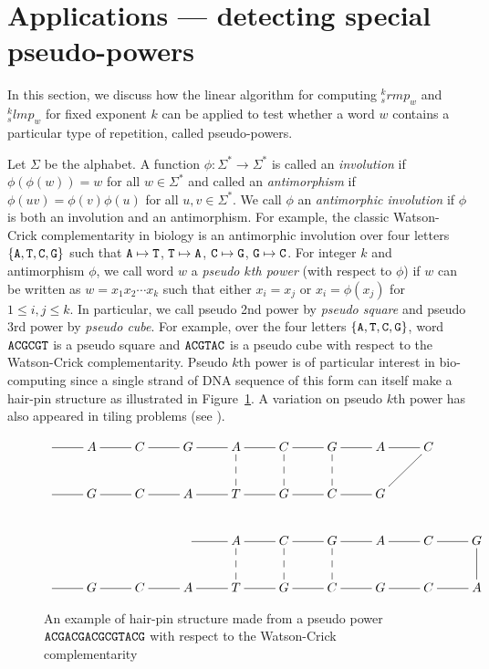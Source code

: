 \documentclass{article}
\begin{document}
\section{Applications --- detecting special pseudo-powers}
In this section, we discuss how the linear algorithm for computing
${}_s^krmp_w$ and ${}_s^klmp_w$ for fixed exponent $k$ can be
applied to test whether a word $w$ contains a particular type of
repetition, called pseudo-powers.


Let $\Sigma$ be the alphabet. A function $\phi:\Sigma^*\to\Sigma^*$
is called an \emph{involution} if $\phi(\phi(w))=w$ for all
$w\in\Sigma^*$ and called an \emph{antimorphism} if
$\phi(uv)=\phi(v)\phi(u)$ for all $u,v\in\Sigma^*$. We call $\phi$
an \emph{antimorphic involution} if $\phi$ is both an involution and
an antimorphism. For example, the classic Watson-Crick
complementarity in biology is an antimorphic involution over four
letters $\{\tt A,T,C,G\}$ such that ${\tt A}\mapsto{\tt T}$, ${\tt
T}\mapsto{\tt A}$, ${\tt C}\mapsto{\tt G}$, ${\tt G}\mapsto{\tt C}$.
For integer $k$ and antimorphism $\phi$, we call word $w$ a
\emph{pseudo $k$th power} (with respect to $\phi$) if $w$ can be
written as $w=x_1x_2\cdots x_k$ such that either $x_i=x_j$ or
$x_i=\phi(x_j)$ for $1\leq i,j\leq k$. In particular, we call pseudo
2nd power by \emph{pseudo square} and pseudo 3rd power by
\emph{pseudo cube}. For example, over the four letters $\{\tt
A,T,C,G\}$, word $\tt ACGCGT$ is a pseudo square and $\tt ACGTAC$ is
a pseudo cube with respect to the Watson-Crick complementarity.
Pseudo $k$th power is of particular interest in bio-computing since
a single strand of DNA sequence of this form can itself make a
hair-pin structure as illustrated in Figure~\ref{figure:dna}. A
variation on pseudo $k$th power has also
appeared in tiling problems (see \cite{Beauquier&Nivat1991}). 


\begin{figure}
\center
  \[\xymatrix{
  \ar@{-}[r] & A\ar@{-}[r] & C\ar@{-}[r] & G\ar@{-}[r] & A\ar@{-}[r] & C\ar@{-}[r] & G\ar@{-}[r] & A\ar@{-}[r] & C\ar@{-}[ld] \\
  \ar@{-}[r] & G\ar@{-}[r] & C\ar@{-}[r] & A\ar@{-}[r] & T\ar@{-}[r]\ar@{--}[u] & G\ar@{-}[r]\ar@{--}[u] & C\ar@{-}[r]\ar@{--}[u] & G \\
  &   &   & \ar@{-}[r] & A\ar@{-}[r]\ar@{--}[d] & C\ar@{-}[r]\ar@{--}[d] & G\ar@{-}[r]\ar@{--}[d] & A\ar@{-}[r] & C\ar@{-}[r] & G \\
  \ar@{-}[r] & G\ar@{-}[r] & C\ar@{-}[r] & A\ar@{-}[r] & T\ar@{-}[r] & G\ar@{-}[r] & C\ar@{-}[r] & G\ar@{-}[r] & C\ar@{-}[r] & A\ar@{-}[u]
  }\]
\caption{An example of hair-pin structure made from a pseudo power
$\tt ACGACGACGCGTACG$ with respect to the Watson-Crick
complementarity}\label{figure:dna}
\end{figure}
\end{document}
